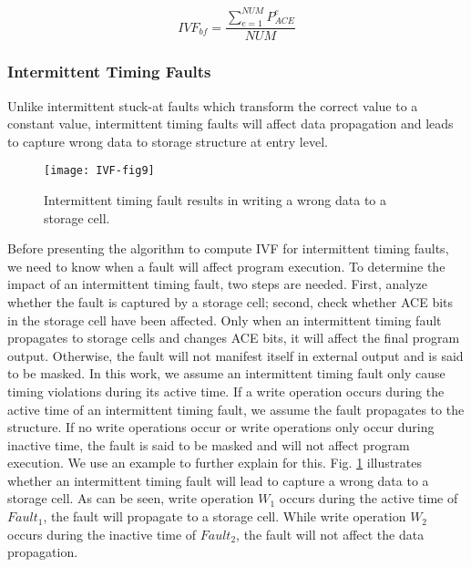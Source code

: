 \begin{equation} \label{eq:IVF-BF}
    IVF_{bf}=\frac{\sum_{e=1}^{NUM}P_{ACE}^{e}}{NUM}
\end{equation}

\subsubsection{Intermittent Timing Faults}
Unlike intermittent stuck-at faults which transform the correct value to a constant value, intermittent timing faults will affect data propagation and leads to capture wrong data to storage structure at entry level.

\begin{figure}[t]
    \centering
    \texttt{[image: IVF-fig9]}\\
    \caption{Intermittent timing fault results in writing a wrong data to a storage cell.}
    \label{fig:IM-timing-fault}
\end{figure}

Before presenting the algorithm to compute IVF for intermittent timing faults, we need to know when a fault will affect program execution. To determine the impact of an intermittent timing fault, two steps are needed. First, analyze whether the fault is captured by a storage cell; second, check whether ACE bits in the storage cell have been affected. Only when an intermittent timing fault propagates to storage cells and changes ACE bits, it will affect the final program output. Otherwise, the fault will not manifest itself in external output and is said to be masked. In this work, we assume an intermittent timing fault only cause timing violations during its active time. If a write operation occurs during the active time of an intermittent timing fault, we assume the fault propagates to the structure. If no write operations occur or write operations only occur during inactive time, the fault is said to be masked and will not affect program execution. We use an example to further explain for this. Fig. \ref{fig:IM-timing-fault} illustrates whether an intermittent timing fault will lead to capture a wrong data to a storage cell. As can be seen, write operation $W_1$ occurs during the active time of $Fault_1$, the fault will propagate to a storage cell. While write operation $W_2$ occurs during the inactive time of $Fault_2$, the fault will not affect the data propagation.

